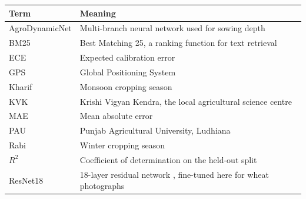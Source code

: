 \begin{longtable}{lp{}}
\toprule
\textbf{Term} & \textbf{Meaning} \\
\midrule
\endhead
AgroDynamicNet & Multi-branch neural network used for sowing depth \\
BM25 & Best Matching 25, a ranking function for text retrieval \cite{robertson2009bm25} \\
ECE & Expected calibration error \\
GPS & Global Positioning System \\
Kharif & Monsoon cropping season \\
KVK & Krishi Vigyan Kendra, the local agricultural science centre \\
MAE & Mean absolute error \\
PAU & Punjab Agricultural University, Ludhiana \\
Rabi & Winter cropping season \\
$R^{2}$ & Coefficient of determination on the held-out split \\
ResNet18 & 18-layer residual network \cite{he2016resnet}, fine-tuned here for wheat photographs \\
\bottomrule
\end{longtable}

